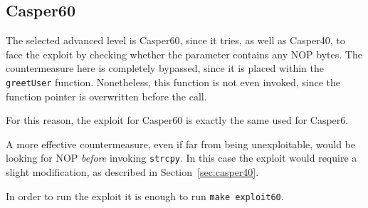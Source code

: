\subsection{Casper60}
The selected advanced level is Casper60, since it tries, as well as Casper40, to face the exploit by checking whether the parameter contains any NOP bytes. The countermeasure here is completely bypassed, since it is placed within the \texttt{greetUser} function. Nonetheless, this function is not even invoked, since the function pointer is overwritten before the call. 

For this reason, the exploit for Casper60 is exactly the same used for Casper6. 

A more effective countermeasure, even if far from being unexploitable, would be looking for NOP \textit{before} invoking \texttt{strcpy}. In this case the exploit would require a slight modification, as described in Section~\ref{sec:casper40}.

In order to run the exploit it is enough to run \texttt{make exploit60}.